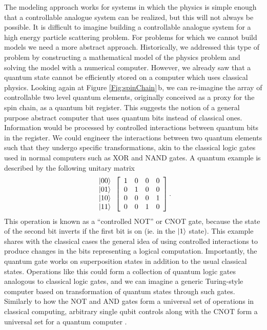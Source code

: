 The modeling approach works for systems in which the physics is simple enough that a controllable analogue system can be realized, but this will not always be possible.
It is difficult to imagine building a controllable analogue system for a high energy particle scattering problem.
For problems for which we cannot build models we need a more abstract approach.
Historically, we addressed this type of problem by constructing a mathematical model of the physics problem and solving the model with a numerical computer.
However, we already saw that a quantum state cannot be efficiently stored on a computer which uses classical physics.
Looking again at Figure \ref{Fig:spinChain}\,b, we can re-imagine the array of controllable two level quantum elements, originally conceived as a proxy for the spin chain, as a quantum bit register.
This suggests the notion of a general purpose abstract computer that uses quantum bits instead of classical ones.
Information would be processed by controlled interactions between quantum bits in the register.
We could engineer the interactions between two quantum elements such that they undergo specific transformations, akin to the classical logic gates used in normal computers such as XOR and NAND gates.
A quantum example is described by the following unitary matrix \begin{equation}
\begin{array}{c} |00\rangle \\ |01\rangle \\ |10\rangle \\ |11\rangle \end{array} \left[ \begin{array}{cccc} 1 & 0 & 0 & 0 \\ 0 & 1 & 0 & 0 \\ 0 & 0 & 0 & 1 \\ 0 & 0 & 1 & 0 \end{array} \right]. \label{eq:CNOT} \end{equation}
This operation is known as a ``controlled NOT'' or CNOT gate, because the state of the second bit inverts if the first bit is on (ie. in the $|1\rangle$ state).
This example shares with the classical cases the general idea of using controlled interactions to produce changes in the bits representing a logical computation.
Importantly, the quantum gate works on superposition states in addition to the usual classical states.
Operations like this could form a collection of quantum logic gates analogous to classical logic gates, and we can imagine a generic Turing-style computer based on transformation of quantum states through such gates.
Similarly to how the NOT and AND gates form a universal set of operations in classical computing, arbitrary single qubit controls along with the CNOT form a universal set for a quantum computer \cite{Barenco:gates1995}.

